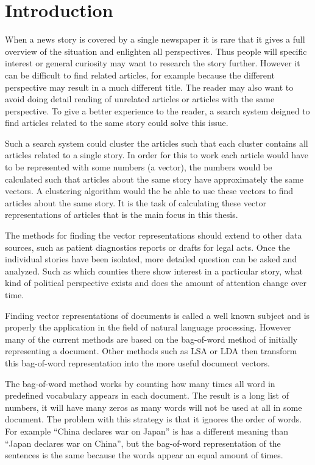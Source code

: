 \chapter{Introduction}

When a news story is covered by a single newspaper it is rare that it gives a full overview of the situation and enlighten all perspectives. Thus people will specific interest or general curiosity may want to research the story further. However it can be difficult to find related articles, for example because the different perspective may result in a much different title. The reader may also want to avoid doing detail reading of unrelated articles or articles with the same perspective. To give a better experience to the reader, a search system deigned to find articles related to the same story could solve this issue.

Such a search system could cluster the articles such that each cluster contains all articles related to a single story. In order for this to work each article would have to be represented with some numbers (a vector), the numbers would be calculated such that articles about the same story have approximately the same vectors. A clustering algorithm would the be able to use these vectors to find articles about the same story. It is the task of calculating these vector representations of articles that is the main focus in this thesis.

The methods for finding the vector representations should extend to other data sources, such as patient diagnostics reports or drafts for legal acts.
Once the individual stories have been isolated, more detailed question can be asked and analyzed. Such as which counties there show interest in a particular story, what kind of political perspective exists and does the amount of attention change over time. 

Finding vector representations of documents is called a well known subject and is properly the application in the field of natural language processing. However many of the current methods are based on the bag-of-word method of initially representing a document. Other methods such as LSA or LDA then transform this bag-of-word representation into the more useful document vectors.

The bag-of-word method works by counting how many times all word in predefined vocabulary appears in each document. The result is a long list of numbers, it will have many zeros as many words will not be used at all in some document. The problem with this strategy is that it ignores the order of words. For example ``China declares war on Japan'' is has a different meaning than ``Japan declares war on China'', but the bag-of-word representation of the sentences is the same because the words appear an equal amount of times.

